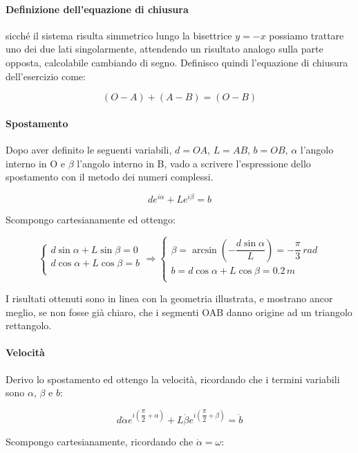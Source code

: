 \documentclass[main.tex]{subfiles}
\begin{document}
\paragraph{Definizione dell'equazione di chiusura} sicché il sistema risulta simmetrico lungo la bisettrice $y = -x$ possiamo trattare uno dei due lati singolarmente, attendendo un risultato analogo sulla parte opposta, calcolabile cambiando di segno. Definisco quindi l'equazione di chiusura dell'esercizio come:

\[
	(O-A) + (A-B) = (O-B)
\]

\paragraph{Spostamento} Dopo aver definito le seguenti variabili, $d = OA$, $L = AB$, $b = OB$, $\alpha$ l'angolo interno in O e $\beta$ l'angolo interno in B, vado a scrivere l'espressione dello spostamento con il metodo dei numeri complessi.

\[
	de^{i\alpha} + Le^{i\beta} = b
\]

Scompongo cartesianamente ed ottengo:

\[
	\begin{cases}
		d\sin\alpha + L\sin\beta = 0\\
		d\cos\alpha + L\cos\beta = b\\
	\end{cases}
	\Longrightarrow
	\begin{cases}
		\beta = \arcsin\left (-\dfrac{d\sin\alpha}{L}\right ) = -\dfrac{\pi}{3}\,rad\\
		b = d\cos\alpha + L\cos\beta = 0.2\,m\\
	\end{cases}
\]

I risultati ottenuti sono in linea con la geometria illustrata, e mostrano ancor meglio, se non fosse già chiaro, che i segmenti OAB danno origine ad un triangolo rettangolo.

\paragraph{Velocità} Derivo lo spostamento ed ottengo la velocità, ricordando che i termini variabili sono $\alpha$, $\beta$ e $b$:

\[
	d\dot{\alpha}e^{i \left (\dfrac{\pi}{2} + \alpha\right )} + L\dot{\beta}e^{i \left (\dfrac{\pi}{2} + \beta\right )} = \dot{b}
\]

Scompongo cartesianamente, ricordando che $\dot{\alpha} = \omega$:
\end{document}

